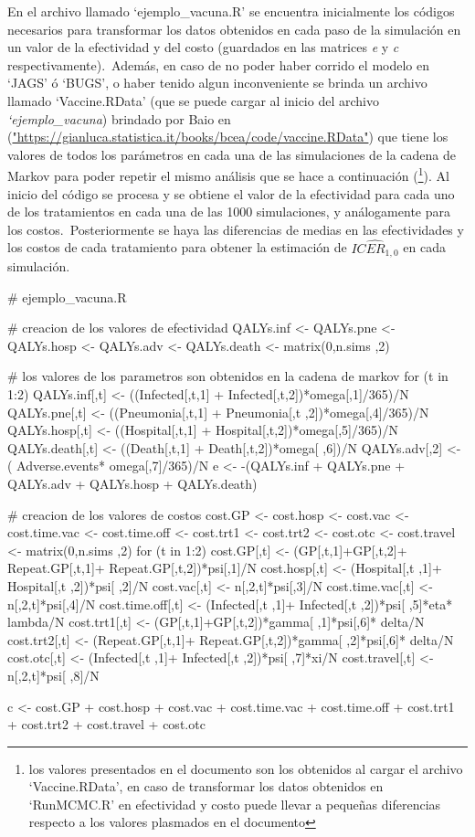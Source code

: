 \documentclass[12pt]{article}
\begin{document}
En el archivo llamado `ejemplo\_vacuna.R' se encuentra inicialmente los códigos necesarios para transformar los datos obtenidos en cada paso de la simulación en un valor de la efectividad y del costo (guardados en las matrices \textit{e} y \textit{c} respectivamente).\
Además, en caso de no poder haber corrido el modelo en `JAGS' ó `BUGS', o haber tenido algun inconveniente se brinda un archivo llamado `Vaccine.RData' (que se puede cargar al inicio del archivo \textit{`ejemplo\_vacuna}) brindado por Baio en (\url{"https://gianluca.statistica.it/books/bcea/code/vaccine.RData"}) que tiene los valores de todos los parámetros en cada una de las simulaciones de la cadena de Markov para poder repetir el mismo análisis que se hace a continuación (\footnote{los valores presentados en el documento son los obtenidos al cargar el archivo `Vaccine.RData', en caso de transformar los datos obtenidos en `RunMCMC.R' en efectividad y costo puede llevar a pequeñas diferencias respecto a los valores plasmados en el documento}). Al inicio del código se procesa y se obtiene el valor de la efectividad para cada uno de los tratamientos en cada una de las 1000 simulaciones, y análogamente para los costos.\
Posteriormente se haya las diferencias de medias en las efectividades y los costos de cada tratamiento para obtener la estimación de $\widehat{ICER_{1,0}}$ en cada simulación.\

\begin{Rcode}
# ejemplo_vacuna.R

# creacion de los valores de efectividad
QALYs.inf <- QALYs.pne <- QALYs.hosp <- QALYs.adv <- 
QALYs.death <- matrix(0,n.sims ,2)

# los valores de los parametros son obtenidos en la cadena de markov
for (t in 1:2) {
  QALYs.inf[,t] <- ((Infected[,t,1] + Infected[,t,2])*omega[,1]/365)/N
  QALYs.pne[,t] <- ((Pneumonia[,t,1] + Pneumonia[,t ,2])*omega[,4]/365)/N
  QALYs.hosp[,t] <- ((Hospital[,t,1] + Hospital[,t,2])*omega[,5]/365)/N
  QALYs.death[,t] <- ((Death[,t,1] + Death[,t,2])*omega[ ,6])/N
}
QALYs.adv[,2] <- ( Adverse.events* omega[,7]/365)/N
e <- -(QALYs.inf + QALYs.pne + QALYs.adv + QALYs.hosp + QALYs.death)


# creacion de los valores de costos
cost.GP <- cost.hosp <- cost.vac <- cost.time.vac <- cost.time.off <- cost.trt1 <- cost.trt2 <- cost.otc <- cost.travel <- matrix(0,n.sims ,2)
for (t in 1:2) {
  cost.GP[,t] <- (GP[,t,1]+GP[,t,2]+ Repeat.GP[,t,1]+
  Repeat.GP[,t,2])*psi[,1]/N
  cost.hosp[,t] <- (Hospital[,t ,1]+ Hospital[,t ,2])*psi[ ,2]/N
  cost.vac[,t] <- n[,2,t]*psi[,3]/N
  cost.time.vac[,t] <- n[,2,t]*psi[,4]/N
  cost.time.off[,t] <- (Infected[,t ,1]+ 
  Infected[,t ,2])*psi[ ,5]*eta* lambda/N
  cost.trt1[,t] <- (GP[,t,1]+GP[,t,2])*gamma[ ,1]*psi[,6]* delta/N
  cost.trt2[,t] <- (Repeat.GP[,t,1]+ 
  Repeat.GP[,t,2])*gamma[ ,2]*psi[,6]* delta/N
  cost.otc[,t] <- (Infected[,t ,1]+ Infected[,t ,2])*psi[ ,7]*xi/N
  cost.travel[,t] <- n[,2,t]*psi[ ,8]/N
}

c <- cost.GP + cost.hosp + cost.vac + cost.time.vac + 
cost.time.off + cost.trt1 + cost.trt2 + cost.travel + cost.otc
\end{Rcode}
\end{document}
